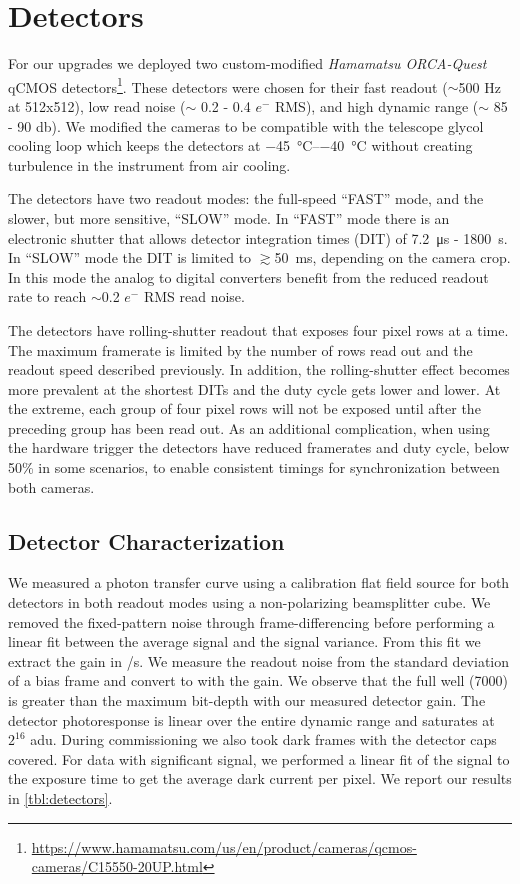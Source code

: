 \section{Detectors}\label{sec:detectors}

For our upgrades we deployed two custom-modified \textit{Hamamatsu ORCA-Quest} qCMOS detectors\footnote{\url{https://www.hamamatsu.com/us/en/product/cameras/qcmos-cameras/C15550-20UP.html}}. These detectors were chosen for their fast readout ($\sim$500 Hz at 512x512), low read noise ($\sim$ 0.2 - 0.4 $e^-$ RMS), and high dynamic range ($\sim$ 85 - 90 \si{\decibel}). We modified the cameras to be compatible with the telescope glycol cooling loop which keeps the detectors at \SIrange{-45}{-40}{\celsius} without creating turbulence in the instrument from air cooling.

The detectors have two  readout modes: the full-speed ``FAST'' mode, and the slower, but more sensitive, ``SLOW'' mode. In ``FAST'' mode there is an electronic shutter that allows detector integration times (DIT) of \SI{7.2}{\micro\second} - \SI{1800}{\second}. In ``SLOW'' mode the DIT is limited to $\gtrsim$\SI{50}{\milli\second}, depending on the camera crop. In this mode the analog to digital converters benefit from the reduced readout rate to reach $\sim$0.2 $e^-$ RMS read noise.

The detectors have rolling-shutter readout that exposes four pixel rows at a time. The maximum framerate is limited by the number of rows read out and the readout speed described previously. In addition, the rolling-shutter effect becomes more prevalent at the shortest DITs and the duty cycle gets lower and lower. At the extreme, each group of four pixel rows will not be exposed until after the preceding group has been read out. As an additional complication, when using the hardware trigger the detectors have reduced framerates and duty cycle, below 50\% in some scenarios, to enable consistent timings for synchronization between both cameras.

\subsection{Detector Characterization}

We measured a photon transfer curve using a calibration flat field source for both detectors in both readout modes using a non-polarizing beamsplitter cube. We removed the fixed-pattern noise through frame-differencing before performing a linear fit between the average signal and the signal variance. From this fit we extract the gain in \si{\electron/\second}. We measure the readout noise from the standard deviation of a bias frame and convert to \si{\electron} with the gain. We observe that the full well (\SI{7000}{\electron}) is greater than the maximum bit-depth with our measured detector gain. The detector photoresponse is linear over the entire dynamic range and saturates at $2^{16}$ \si{adu}. During commissioning we also took dark frames with the detector caps covered. For data with significant signal, we performed a linear fit of the signal to the exposure time to get the average dark current per pixel. We report our results in \autoref{tbl:detectors}.

